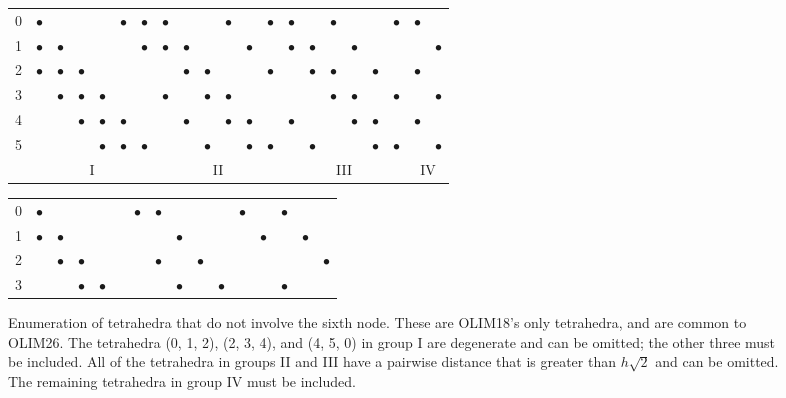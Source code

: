 \documentclass[eikonal.tex]{subfiles}
\begin{document}
\begin{figure}[t]
  \centering
  \begin{tabular}{c|cccccc|cccccc|cccccc|cc}
    0 & $\bullet$ & & & & $\bullet$ & $\bullet$ & $\bullet$ & & & $\bullet$ & & $\bullet$ & $\bullet$ & & $\bullet$ & & & $\bullet$ & $\bullet$ & \\
    1 & $\bullet$ & $\bullet$ & & & & $\bullet$ & $\bullet$ & $\bullet$ & & & $\bullet$ & & $\bullet$ & $\bullet$ & & $\bullet$ & & & & $\bullet$ \\
    2 & $\bullet$ & $\bullet$ & $\bullet$ & & & & & $\bullet$ & $\bullet$ & & & $\bullet$ & & $\bullet$ & $\bullet$ & & $\bullet$ & & $\bullet$ & \\
    3 & & $\bullet$ & $\bullet$ & $\bullet$ & & & $\bullet$ & & $\bullet$ & $\bullet$ & & & & & $\bullet$ & $\bullet$ & & $\bullet$ & & $\bullet$ \\
    4 & & & $\bullet$ & $\bullet$ & $\bullet$ & & & $\bullet$ & & $\bullet$ & $\bullet$ & & $\bullet$ & & & $\bullet$ & $\bullet$ & & $\bullet$ & \\
    5 & & & & $\bullet$ & $\bullet$ & $\bullet$ & & & $\bullet$ & & $\bullet$ & $\bullet$ & & $\bullet$ & & & $\bullet$ & $\bullet$ & & $\bullet$ \\
    \multicolumn{1}{c}{} & \multicolumn{6}{c}{I} & \multicolumn{6}{c}{II} & \multicolumn{6}{c}{III} & \multicolumn{2}{c}{IV}
  \end{tabular}
  \caption{Enumeration of tetrahedra that do not involve the sixth
    node. These are OLIM18's only tetrahedra, and are common to
    OLIM26. The tetrahedra (0, 1, 2), (2, 3, 4), and (4, 5, 0) in
    group I are degenerate and can be omitted; the other three must be
    included. All of the tetrahedra in groups II and III have a
    pairwise distance that is greater than $h \sqrt{2}$ and can be
    omitted. The remaining tetrahedra in group IV must be
    included.}\label{fig:olim18-tetrahedra}
  \vspace{1em}
  \begin{tabular}{c|cccccc|cccccc|ccc}
    0 & $\bullet$ & & & & & $\bullet$ & $\bullet$ & & & & $\bullet$ & & $\bullet$ & & \\
    1 & $\bullet$ & $\bullet$ & & & & & & $\bullet$ & & & & $\bullet$ & & $\bullet$ & \\
    2 & & $\bullet$ & $\bullet$ & & & & $\bullet$ & & $\bullet$ & & & & & & $\bullet$ \\
    3 & & & $\bullet$ & $\bullet$ & & & & $\bullet$ & & $\bullet$ & & & $\bullet$ & & \\

\end{tabular}
\end{figure}
\end{document}
